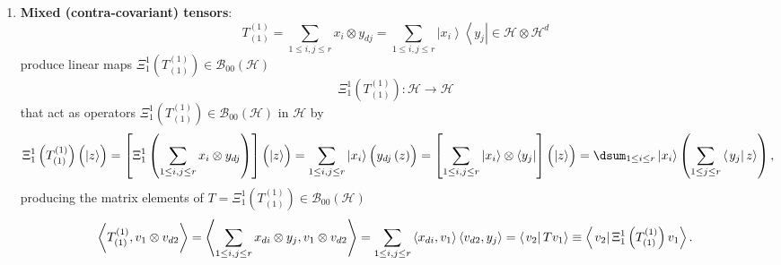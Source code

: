 \documentclass[aps,preprint]{revtex4}
\begin{document}
\begin{enumerate}
\item \textbf{Mixed (contra-covariant) tensors}: 
\begin{equation}
T_{\left( 1\right) }^{\left( 1\right) }=\sum_{1\leq i,j\leq r}x_{i}\otimes
y_{dj}=\sum_{1\leq i,j\leq r}\left\vert x_{i}\right\rangle \left\langle
y_{j}\right\vert \in \mathcal{H}\otimes \mathcal{H}^{d}
\end{equation}%
produce linear maps $\Xi _{1}^{1}\left( T_{\left( 1\right) }^{\left(
1\right) }\right) \in \mathcal{B}_{00}\left( \mathcal{H}\right) $ 
\begin{equation}
\Xi _{1}^{1}\left( T_{\left( 1\right) }^{\left( 1\right) }\right) :\mathcal{H%
}\rightarrow \mathcal{H}
\end{equation}%
that act as operators $\Xi _{1}^{1}\left( T_{\left( 1\right) }^{\left(
1\right) }\right) \in \mathcal{B}_{00}\left( \mathcal{H}\right) $ in $%
\mathcal{H}$ by 
\begin{equation}
\Xi _{1}^{1}\left( T_{\left( 1\right) }^{\left( 1\right) }\right) \left( 
\overset{}{\left\vert z\right\rangle }\right) =\left[ \Xi _{1}^{1}\left(
\sum_{1\leq i,j\leq r}x_{i}\otimes y_{dj}\right) \right] \left( \overset{}{%
\left\vert z\right\rangle }\right) =\sum_{1\leq i,j\leq r}\left\vert
x_{i}\right\rangle \left( \overset{}{y_{dj}\left( z\right) }\right) =\left[
\sum_{1\leq i,j\leq r}\left\vert x_{i}\right\rangle \otimes \left\langle
y_{j}\right\vert \right] \left( \overset{}{\left\vert z\right\rangle }%
\right) =\dsum_{1\leq i\leq r}\left\vert \overset{}{x_{i}}\right\rangle
\left( \sum_{1\leq j\leq r}\left\langle \left. y_{j}\right\vert
z\right\rangle \right) ,
\end{equation}%
producing the matrix elements of $T=\Xi _{1}^{1}\left( T_{\left( 1\right)
}^{\left( 1\right) }\right) \in \mathcal{B}_{00}\left( \mathcal{H}\right) $ 
\begin{equation}
\left\langle \overset{}{T_{\left( 1\right) }^{\left( 1\right) },v_{1}\otimes
v_{d2}}\right\rangle =\left\langle \overset{}{\sum_{1\leq i,j\leq
r}x_{di}\otimes y_{j},v_{1}\otimes v_{d2}}\right\rangle =\sum_{1\leq i,j\leq
r}\left\langle \overset{}{x_{di},v_{1}}\right\rangle \left\langle \overset{}{%
v_{d2},y_{j}}\right\rangle =\left\langle \left. \overset{}{v_{2}}\right\vert
Tv_{1}\right\rangle \equiv \left\langle \left. \overset{}{v_{2}}\right\vert
\Xi _{1}^{1}\left( T_{\left( 1\right) }^{\left( 1\right) }\right)
v_{1}\right\rangle .
\end{equation}
\end{enumerate}
\end{document}
